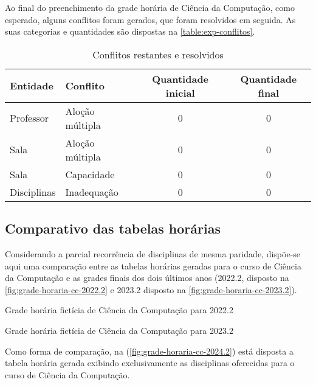 Ao final do preenchimento da grade horária de Ciência da Computação, como esperado, alguns conflitos foram gerados, que foram resolvidos em seguida. As suas categorias e quantidades são dispostas na \autoref{table:exp-conflitos}.

\begin{table}[htbp]\centering
  \caption{Conflitos restantes e resolvidos}
  \label{table:exp-conflitos}
  \begin{tabular}{| l l c c |}
    \hline
    \textbf{Entidade} & \textbf{Conflito} & \textbf{Quantidade inicial} & \textbf{Quantidade final} \\
    \hline
    Professor         & Aloção múltipla   & 0                           & 0                         \\
    Sala              & Aloção múltipla   & 0                           & 0                         \\
    Sala              & Capacidade        & 0                           & 0                         \\
    Disciplinas       & Inadequação       & 0                           & 0                         \\
    \hline
  \end{tabular}
\end{table}

\subsection{Comparativo das tabelas horárias}

Considerando a parcial recorrência de disciplinas de mesma paridade, dispõe-se aqui uma comparação entre as tabelas horárias geradas para o curso de Ciência da Computação e as grades finais dos dois últimos anos (2022.2, disposto na \autoref{fig:grade-horaria-cc-2022.2} e 2023.2 disposto na \autoref{fig:grade-horaria-cc-2023.2}).

\begin{MyCenteredFigure}
  \caption{Grade horária fictícia de Ciência da Computação para 2022.2}
  \label{fig:grade-horaria-cc-2022.2}
\end{MyCenteredFigure}

\begin{MyCenteredFigure}
  \caption{Grade horária fictícia de Ciência da Computação para 2023.2}
  \label{fig:grade-horaria-cc-2023.2}
\end{MyCenteredFigure}

Como forma de comparação, na (\autoref{fig:grade-horaria-cc-2024.2}) está disposta a tabela horária gerada exibindo exclusivamente as disciplinas oferecidas para o curso de Ciência da Computação.

